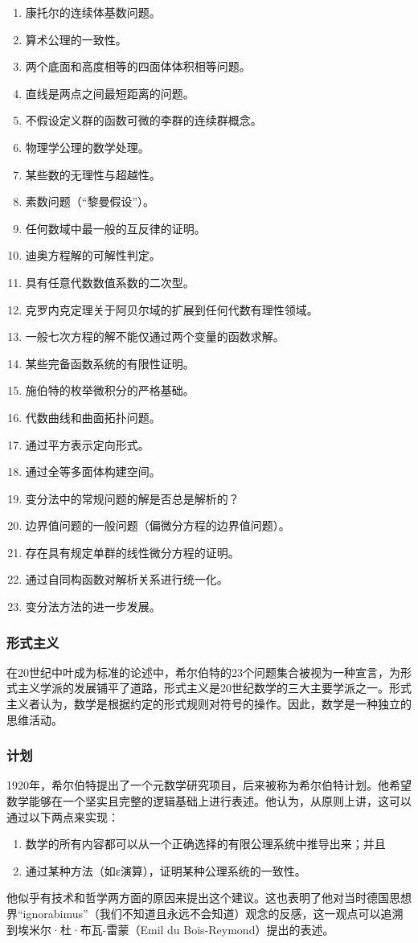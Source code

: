 \begin{enumerate}
\item 康托尔的连续体基数问题。
\item 算术公理的一致性。
\item 两个底面和高度相等的四面体体积相等问题。
\item 直线是两点之间最短距离的问题。
\item 不假设定义群的函数可微的李群的连续群概念。
\item 物理学公理的数学处理。
\item 某些数的无理性与超越性。
\item 素数问题（“黎曼假设”）。
\item 任何数域中最一般的互反律的证明。
\item 迪奥方程解的可解性判定。
\item 具有任意代数数值系数的二次型。
\item 克罗内克定理关于阿贝尔域的扩展到任何代数有理性领域。
\item 一般七次方程的解不能仅通过两个变量的函数求解。
\item 某些完备函数系统的有限性证明。
\item 施伯特的枚举微积分的严格基础。
\item 代数曲线和曲面拓扑问题。
\item 通过平方表示定向形式。
\item 通过全等多面体构建空间。
\item 变分法中的常规问题的解是否总是解析的？
\item 边界值问题的一般问题（偏微分方程的边界值问题）。
\item 存在具有规定单群的线性微分方程的证明。
\item 通过自同构函数对解析关系进行统一化。
\item 变分法方法的进一步发展。
\end{enumerate}
\subsubsection{形式主义}
在20世纪中叶成为标准的论述中，希尔伯特的23个问题集合被视为一种宣言，为形式主义学派的发展铺平了道路，形式主义是20世纪数学的三大主要学派之一。形式主义者认为，数学是根据约定的形式规则对符号的操作。因此，数学是一种独立的思维活动。
\subsubsection{计划}
1920年，希尔伯特提出了一个元数学研究项目，后来被称为希尔伯特计划。他希望数学能够在一个坚实且完整的逻辑基础上进行表述。他认为，从原则上讲，这可以通过以下两点来实现：
\begin{enumerate}
\item 数学的所有内容都可以从一个正确选择的有限公理系统中推导出来；并且
\item 通过某种方法（如ε演算），证明某种公理系统的一致性。
\end{enumerate}
他似乎有技术和哲学两方面的原因来提出这个建议。这也表明了他对当时德国思想界“ignorabimus”（我们不知道且永远不会知道）观念的反感，这一观点可以追溯到埃米尔·杜·布瓦-雷蒙（Emil du Bois-Reymond）提出的表述。

